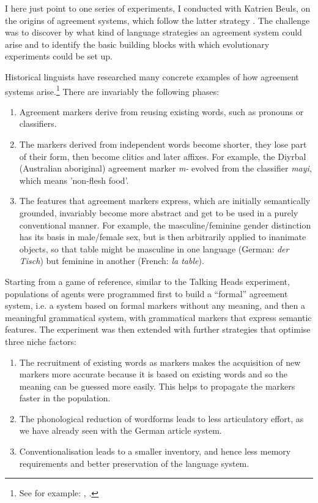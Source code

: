 I here just point to one series of experiments, I conducted with Katrien Beuls, on the origins of agreement 
systems, which follow the latter strategy \cite{Beuls:2013}. The challenge was to discover by 
what kind of language strategies an agreement system could arise and to identify the basic building blocks with which 
evolutionary experiments could be set up. 

Historical linguists have researched many concrete examples of how agreement systems arise.\footnote{See for example: \cite{Lehmann:1988}, \cite{Luraghi:2011}.}
There are invariably the following phases: 
\begin{enumerate}
\item Agreement markers derive from reusing existing words, such as pronouns or classifiers. 
\item The markers derived from independent words become shorter, they lose part of their form, 
then become clitics and later affixes. For example, the Diyrbal (Australian aboriginal)
agreement marker {\itshape m-} evolved from the classifier {\itshape mayi}, which means 'non-flesh food'. 
\item The features that agreement markers express, which are initially semantically 
grounded, invariably become more abstract and get to be used in 
a purely conventional manner. For example, the masculine/feminine 
gender distinction has its basis in male/female sex, but is then arbitrarily applied to inanimate objects, so that table 
might be masculine in one language (German: {\itshape der Tisch}) but feminine in another (French: {\itshape la table}). 
\end{enumerate}
Starting from a game of reference, similar to the Talking Heads experiment, populations of agents were programmed 
first to build a ``formal'' agreement system, i.e. a system based on formal markers without any meaning, and then 
a meaningful grammatical system, with grammatical markers that express semantic features. The experiment was 
then extended with further strategies that optimise three niche factors:
\begin{enumerate}
\item The recruitment of existing words as markers makes the acquisition of new markers more accurate because it is based 
on existing words and so the meaning can be guessed more easily. This helps to propagate the markers faster in the population. 
\item The phonological reduction of wordforms leads to less articulatory effort, as we have already seen with the German 
article system. 
\item Conventionalisation leads to a smaller inventory, and hence less memory requirements and better preservation of the 
language system. 
\end{enumerate}

